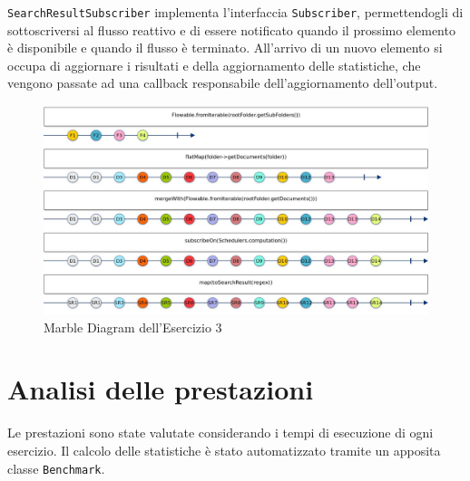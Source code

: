 \documentclass[a4paper]{article}
\begin{document}
\texttt{SearchResultSubscriber} implementa l'interfaccia \texttt{Subscriber}, permettendogli di sottoscriversi al flusso reattivo e di essere notificato quando il prossimo elemento \`e disponibile e quando il flusso \`e terminato.
%
All'arrivo di un nuovo elemento si occupa di aggiornare i risultati e della aggiornamento delle statistiche, che vengono passate ad una callback responsabile dell'aggiornamento dell'output.

\begin{figure}[H]

    \centering

    \includegraphics[width=\linewidth, height=\textheight,keepaspectratio]{ReactiveStreams}

    \caption{Marble Diagram dell'Esercizio 3}

    \label{fig:event-loop}

\end{figure}

\section{Analisi delle prestazioni}\label{analisi-delle-prestazioni}

Le prestazioni sono state valutate considerando i tempi di esecuzione di ogni esercizio.
%
Il calcolo delle statistiche \`e stato automatizzato tramite un apposita classe \texttt{Benchmark}.
\end{document}
